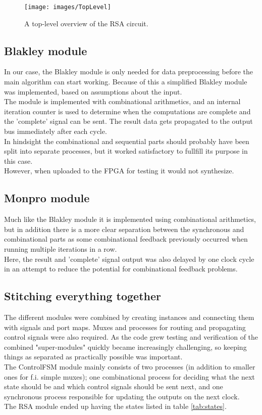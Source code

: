 \begin{figure}[H]
\centering
\texttt{[image: images/TopLevel]}
\caption{A top-level overview of the RSA circuit.}
\label{fig:toplevel}
\end{figure}


\subsection{Blakley module}
In our case, the Blakley module is only needed for data preprocessing before the main algorithm can start working. Because of this a simplified Blakley module was implemented, based on assumptions about the input.\\
The module is implemented with combinational arithmetics, and an internal iteration counter is used to determine when the computations are complete and the 'complete' signal can be sent. The result data gets propagated to the output bus immediately after each cycle.\\
In hindsight the combinational and sequential parts should probably have been split into separate processes, but it worked satisfactory to fullfill its purpose in this case.\\
However, when uploaded to the FPGA for testing it would not synthesize.

\subsection{Monpro module}
Much like the Blakley module it is implemented using combinational arithmetics, but in addition there is a more clear separation between the synchronous and combinational parts as some combinational feedback previously occurred when running multiple iterations in a row.\\
Here, the result and 'complete' signal output was also delayed by one clock cycle in an attempt to reduce the potential for combinational feedback problems.

\subsection{Stitching everything together}
The different modules were combined by creating instances and connecting them with signals and port maps. Muxes and processes for routing and propagating control signals were also required.
As the code grew testing and verification of the combined "super-modules" quickly became increasingly challenging, so keeping things as separated as practically possible was important.\\ 
The ControlFSM module mainly consists of two processes (in addition to smaller ones for f.i. simple muxes); one combinational process for deciding what the next state should be and which control signals should be sent next, and one synchronous process responsible for updating the outputs on the next clock.
\\
The RSA module ended up having the states listed in table \ref{tab:states}.\\

